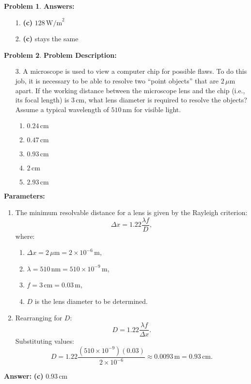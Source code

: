\documentclass[12pt]{article}
\theoremstyle{definition} %
\newtheorem{problem}{Problem}
\theoremstyle{plain} %
\begin{document}
\begin{problem}
\textbf{Answers:}
\begin{enumerate}
    \item[1.] \textbf{(c)} \(128 \, \text{W/m}^2\)
    \item[2.] \textbf{(c)} stays the same
\end{enumerate}
\end{problem}
\begin{problem}
    
\textbf{Problem Description:}

\begin{enumerate}
    \item[3.] A microscope is used to view a computer chip for possible flaws. To do this job, it is necessary to be able to resolve two “point objects” that are \(2 \, \mu\text{m}\) apart. If the working distance between the microscope lens and the chip (i.e., its focal length) is \(3 \, \text{cm}\), what lens diameter is required to resolve the objects? Assume a typical wavelength of \(510 \, \text{nm}\) for visible light.
    \begin{enumerate}
        \item \(0.24 \, \text{cm}\)
        \item \(0.47 \, \text{cm}\)
        \item \textbf{\(0.93 \, \text{cm}\)}
        \item \(2 \, \text{cm}\)
        \item \(2.93 \, \text{cm}\)
    \end{enumerate}
\end{enumerate}

\textbf{Parameters:}
\begin{enumerate}
    \item The minimum resolvable distance for a lens is given by the Rayleigh criterion:
    $$
    \Delta x = 1.22 \frac{\lambda f}{D},
    $$
    where:
    \begin{enumerate}
        \item \(\Delta x = 2 \, \mu\text{m} = 2 \times 10^{-6} \, \text{m}\),
        \item \(\lambda = 510 \, \text{nm} = 510 \times 10^{-9} \, \text{m}\),
        \item \(f = 3 \, \text{cm} = 0.03 \, \text{m}\),
        \item \(D\) is the lens diameter to be determined.
    \end{enumerate}
    \item Rearranging for \(D\):
    $$
    D = 1.22 \frac{\lambda f}{\Delta x}.
    $$
    Substituting values:
    $$
    D = 1.22 \frac{(510 \times 10^{-9})(0.03)}{2 \times 10^{-6}} \approx 0.0093 \, \text{m} = 0.93 \, \text{cm}.
    $$
\end{enumerate}

\textbf{Answer:} \textbf{(c)} \(0.93 \, \text{cm}\)

\end{problem}
\end{document}
